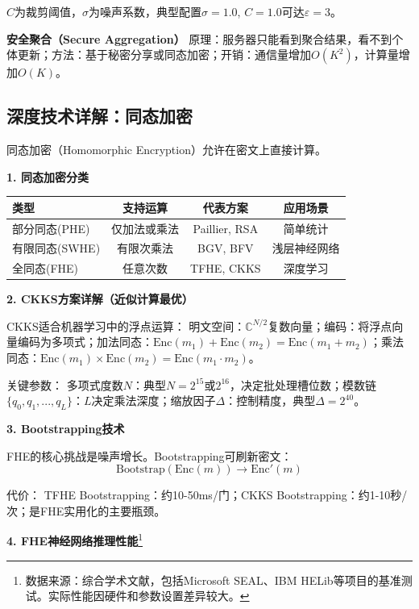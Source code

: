 $C$为裁剪阈值，$\sigma$为噪声系数，典型配置$\sigma=1.0$, $C=1.0$可达$\varepsilon=3$。

\textbf{安全聚合（Secure Aggregation）}
原理：服务器只能看到聚合结果，看不到个体更新；方法：基于秘密分享或同态加密；开销：通信量增加$O(K^2)$，计算量增加$O(K)$。

\subsection{深度技术详解：同态加密}

同态加密（Homomorphic Encryption）允许在密文上直接计算\cite{HomomorphicEncryption2024, TFHE2024, CKKS2024}。

\textbf{1. 同态加密分类}

\begin{table}[H]
\centering
\small
\begin{tabular}{lccc}
\toprule
\textbf{类型} & \textbf{支持运算} & \textbf{代表方案} & \textbf{应用场景} \\
\midrule
部分同态(PHE) & 仅加法或乘法 & Paillier, RSA & 简单统计 \\
有限同态(SWHE) & 有限次乘法 & BGV, BFV & 浅层神经网络 \\
全同态(FHE) & 任意次数 & TFHE, CKKS & 深度学习 \\
\bottomrule
\end{tabular}
\end{table}

\textbf{2. CKKS方案详解（近似计算最优）}

CKKS适合机器学习中的浮点运算：
明文空间：$\mathbb{C}^{N/2}$复数向量；编码：将浮点向量编码为多项式；加法同态：$\text{Enc}(m_1) + \text{Enc}(m_2) = \text{Enc}(m_1 + m_2)$；乘法同态：$\text{Enc}(m_1) \times \text{Enc}(m_2) = \text{Enc}(m_1 \cdot m_2)$。

关键参数：
多项式度数$N$：典型$N=2^{15}$或$2^{16}$，决定批处理槽位数；模数链$\{q_0, q_1, ..., q_L\}$：$L$决定乘法深度；缩放因子$\Delta$：控制精度，典型$\Delta=2^{40}$。

\textbf{3. Bootstrapping技术}

FHE的核心挑战是噪声增长。Bootstrapping可刷新密文：
\begin{equation}
\text{Bootstrap}(\text{Enc}(m)) \rightarrow \text{Enc}'(m)
\end{equation}

代价：
TFHE Bootstrapping：约10-50ms/门；CKKS Bootstrapping：约1-10秒/次；是FHE实用化的主要瓶颈。

\textbf{4. FHE神经网络推理性能}\footnote{数据来源：综合学术文献，包括Microsoft SEAL、IBM HELib等项目的基准测试。实际性能因硬件和参数设置差异较大。}

